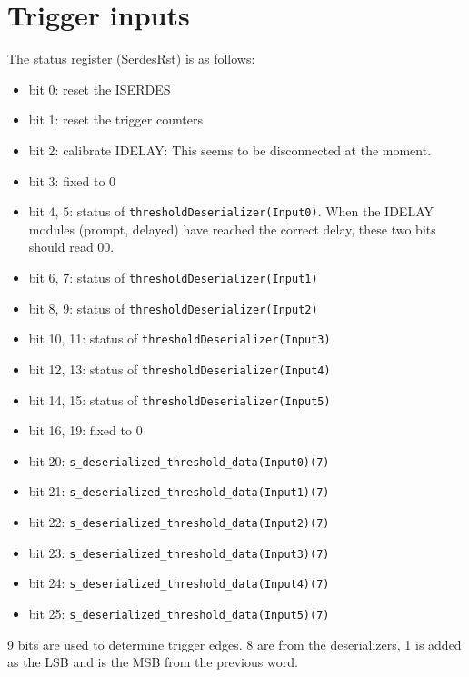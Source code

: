 \section{Trigger inputs}\label{ch:triggerinputs}
The status register (SerdesRst) is as follows:
\begin{itemize}
  \item bit 0: reset the ISERDES
  \item bit 1: reset the trigger counters
  \item bit 2: calibrate IDELAY: This seems to be disconnected at the moment.
  \item bit 3: fixed to 0
  \item bit 4, 5: status of \verb|thresholdDeserializer(Input0)|. When the IDELAY modules (prompt, delayed) have reached the correct delay, these two bits should read 00.
  \item bit 6, 7: status of \verb|thresholdDeserializer(Input1)|
  \item bit 8, 9: status of \verb|thresholdDeserializer(Input2)|
  \item bit 10, 11: status of \verb|thresholdDeserializer(Input3)|
  \item bit 12, 13: status of \verb|thresholdDeserializer(Input4)|
  \item bit 14, 15: status of \verb|thresholdDeserializer(Input5)|
  \item bit 16, 19: fixed to 0
  \item bit 20: \verb|s_deserialized_threshold_data(Input0)(7)|
  \item bit 21: \verb|s_deserialized_threshold_data(Input1)(7)|
  \item bit 22: \verb|s_deserialized_threshold_data(Input2)(7)|
  \item bit 23: \verb|s_deserialized_threshold_data(Input3)(7)|
  \item bit 24: \verb|s_deserialized_threshold_data(Input4)(7)|
  \item bit 25: \verb|s_deserialized_threshold_data(Input5)(7)|
  \end{itemize}

9 bits are used to determine trigger edges. 8 are from the deserializers, 1 is added as the LSB and is the MSB from the previous word.

